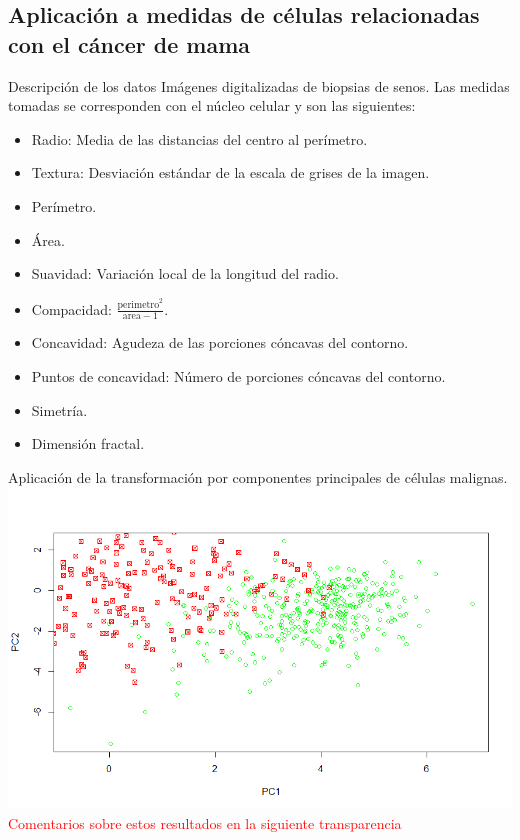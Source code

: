 \documentclass{beamer}
\begin{document}
\subsection{Aplicación a medidas de células relacionadas con el cáncer de mama}
\begin{frame}{Descripción de los datos}
Imágenes digitalizadas de biopsias de senos. Las medidas tomadas se corresponden con el núcleo celular y son las siguientes:
\begin{minipage}[t]{0.48\linewidth}
   \begin{itemize}
        \item Radio: Media de las distancias del centro al perímetro.
        \item Textura: Desviación estándar de la escala de grises de la imagen.
        \item Perímetro.
        \item Área.
        \item Suavidad: Variación local de la longitud del radio.
    \end{itemize}
\end{minipage}
\begin{minipage}[t]{0.48\linewidth}
    \begin{itemize}
    \item Compacidad: $\frac{\mathrm{perimetro}^2}{\mathrm{area}-1}.$
    \item Concavidad: Agudeza de las porciones cóncavas del contorno.
    \item Puntos de concavidad: Número de porciones cóncavas del contorno.
    \item Simetría.
    \item Dimensión fractal.
    \end{itemize}
\end{minipage}
\end{frame}

\begin{frame}{Aplicación de la transformación por componentes principales de células malignas.}
\centering
\includegraphics[scale=0.4]{img/breast_m}
\textcolor{red}{Comentarios sobre estos resultados en la siguiente transparencia}
\end{frame}
\end{document}
